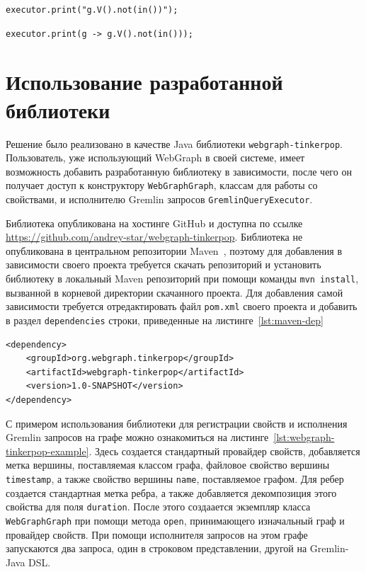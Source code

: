 \documentclass[times,specification,annotation]{itmo-student-thesis}
\begin{document}
\begin{lstlisting}[float=!h,caption={Строковый Gremlin  запрос},label={lst:gremlin-str}]
executor.print("g.V().not(in())");
\end{lstlisting}

\begin{lstlisting}[float=!h,caption={Запрос на Gremlin-Java DSL},label={lst:gremlin-dsl}]
executor.print(g -> g.V().not(in()));
\end{lstlisting}

\section{Использование разработанной библиотеки}

Решение было реализовано в качестве Java библиотеки \texttt{webgraph-tinkerpop}. Пользователь, уже использующий WebGraph в своей системе, имеет возможность добавить разработанную библиотеку в зависимости, после чего он получает доступ к конструктору \texttt{WebGraphGraph}, классам для работы со свойствами, и исполнителю Gremlin запросов \texttt{GremlinQueryExecutor}.

Библиотека опубликована на хостинге GitHub и доступна по ссылке \url{https://github.com/andrey-star/webgraph-tinkerpop}. Библиотека не опубликована в центральном репозитории Maven~\cite{maven}, поэтому для добавления в зависимости своего проекта требуется скачать репозиторий и установить библиотеку в локальный Maven репозиторий при помощи команды \texttt{mvn install}, вызванной в корневой директории скачанного проекта. Для добавления самой зависимости требуется отредактировать файл \texttt{pom.xml} своего проекта и добавить в раздел \texttt{dependencies} строки, приведенные на листинге~\ref{lst:maven-dep}

\begin{lstlisting}[float=!h,caption={Добавление \texttt{webgraph-tinkerpop} в зависимости проекта},label={lst:maven-dep}]
<dependency>
    <groupId>org.webgraph.tinkerpop</groupId>
    <artifactId>webgraph-tinkerpop</artifactId>
    <version>1.0-SNAPSHOT</version>
</dependency>
\end{lstlisting}

С примером использования библиотеки для регистрации свойств и исполнения Gremlin запросов на графе можно ознакомиться на листинге~\ref{lst:webgraph-tinkerpop-example}. Здесь создается стандартный провайдер свойств, добавляется метка вершины, поставляемая классом графа, файловое свойство вершины \texttt{timestamp}, а также свойство вершины \texttt{name}, поставляемое графом. Для ребер создается стандартная метка ребра, а также добавляется декомпозиция этого свойства для поля \texttt{duration}. После этого создаается экземпляр класса \texttt{WebGraphGraph} при помощи метода \texttt{open}, принимающего изначальный граф и провайдер свойств. При помощи исполнителя запросов на этом графе запускаются два запроса, один в строковом представлении, другой на Gremlin-Java DSL.
\end{document}
